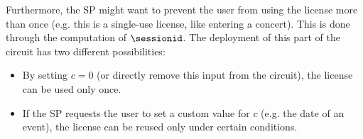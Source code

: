 
Furthermore, the SP might want to prevent the user from using the license more than once (e.g. this is a single-use license, like entering a concert). 
This is done through the computation of $\sessionid$. The deployment of this part of the circuit has two different possibilities:

\begin{itemize}
	\item By setting $c = 0$ (or directly remove this input from the circuit), the license can be used only once.
	\item If the SP requests the user to set a custom value for $c$ (e.g. the date of an event), the license can be reused only under certain conditions.
\end{itemize}

